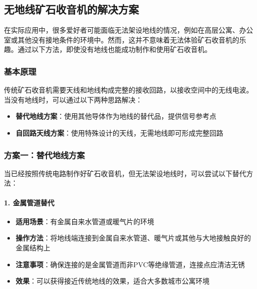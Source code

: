 \documentclass[12pt,UTF8]{ctexbook}
\begin{document}
\subsection{无地线矿石收音机的解决方案}

在实际应用中，很多爱好者可能面临无法架设地线的情况，例如在高层公寓、办公室或其他没有接地条件的环境中。然而，这并不意味着无法体验矿石收音机的乐趣。通过以下方法，即使没有地线也能成功制作和使用矿石收音机。

\subsubsection{基本原理}

传统矿石收音机需要天线和地线构成完整的接收回路，以接收空间中的无线电波。当没有地线时，可以通过以下两种思路解决：

\begin{itemize}[leftmargin=3.5em]
    \item \textbf{替代地线方案}：使用其他导体作为地线的替代品，提供信号参考点
    \item \textbf{自回路天线方案}：使用特殊设计的天线，无需地线即可形成完整回路
\end{itemize}

\subsubsection{方案一：替代地线方案}

当已经按照传统电路制作好矿石收音机，但无法架设地线时，可以尝试以下替代方法：

\paragraph{1. 金属管道替代}
\begin{itemize}[leftmargin=3.5em]
    \item \textbf{适用场景}：有金属自来水管道或暖气片的环境
    \item \textbf{操作方法}：将地线端连接到金属自来水管道、暖气片或其他与大地接触良好的金属结构上
    \item \textbf{注意事项}：确保连接的是金属管道而非PVC等绝缘管道，连接点应清洁无锈
    \item \textbf{效果}：可以获得接近传统地线的效果，适合大多数城市公寓环境
\end{itemize}
\end{document}
